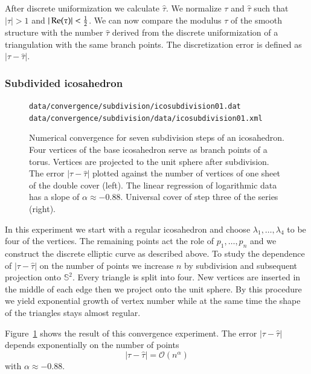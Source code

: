 \documentclass[Thesis]{subfiles}
\begin{document}
After discrete uniformization we calculate $\hat \tau$. We normalize $\tau$ and $\hat \tau$ such that $|\tau|>1$ and $|\operatorname{Re}(\tau)| < \frac{1}{2}$. We can now compare the modulus $\tau$ of the smooth structure with the number $\hat \tau$ derived from the discrete uniformization of a triangulation with the same branch points. The discretization error is defined as $|\tau-\hat \tau|$.

\subsubsection{Subdivided icosahedron}

\begin{figure}
\centering
{}
{\scriptsize\tt data/convergence/subdivision/icosubdivision01.dat}\\
{\scriptsize\tt data/convergence/subdivision/data/icosubdivision01.xml}
\caption{Numerical convergence for seven subdivision steps of an icosahedron.
Four vertices of the base icosahedron serve as branch points of a torus.
Vertices are projected to the unit sphere after subdivision.
The error $|\tau - \hat\tau|$ plotted against the number of vertices of one sheet of the double cover (left).
The linear regression of logarithmic data has a slope of $\alpha\approx-0.88$.
Universal cover of step three of the series (right).
}
\label{fig:convergence_subdivision}
\end{figure}

In this experiment we start with a regular icosahedron and choose $\lambda_1,\ldots,\lambda_4$ to be four of the vertices. The remaining points act the role of $p_1,\ldots,p_n$ and we construct the discrete elliptic curve as described above. To study the dependence of $|\tau-\hat \tau|$ on the number of points we increase $n$ by subdivision and subsequent projection onto $\mathbb S^2$. Every triangle is split into four. New vertices are inserted in the middle of each edge then we project onto the unit sphere. By this procedure we yield exponential growth of vertex number while at the same time the shape of the triangles stays almost regular.

Figure~\ref{fig:convergence_subdivision} shows the result of this convergence experiment. The error $|\tau-\hat \tau|$ depends exponentially on the number of points
\[|\tau-\hat \tau|=\mathcal O (n^\alpha)\]
with $\alpha \approx -0.88$.
\end{document}
